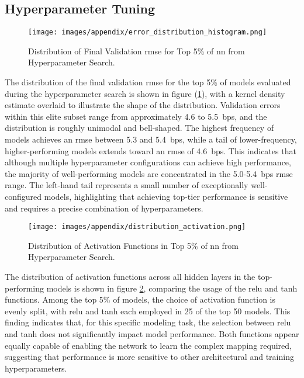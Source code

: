 \subsection{Hyperparameter Tuning}
\begin{figure}[H]
	\centering
	\texttt{[image: images/appendix/error\_distribution\_histogram.png]}
	\caption{Distribution of Final Validation \ac{rmse} for Top 5\% of \ac{nn} from Hyperparameter Search.}
	\label{fig:error_distribution_histogram}
\end{figure}
The distribution of the final validation \ac{rmse} for the top 5\% of models evaluated during the hyperparameter search is shown in figure (\ref{fig:error_distribution_histogram}), with a kernel density estimate overlaid to illustrate the shape of the distribution. Validation errors within this elite subset range from approximately 4.6 to 5.5~\ac{bps}, and the distribution is roughly unimodal and bell-shaped. The highest frequency of models achieves an \ac{rmse} between 5.3 and 5.4~\ac{bps}, while a tail of lower-frequency, higher-performing models extends toward an \ac{rmse} of 4.6~\ac{bps}. This indicates that although multiple hyperparameter configurations can achieve high performance, the majority of well-performing models are concentrated in the 5.0-5.4~\ac{bps} \ac{rmse} range. The left-hand tail represents a small number of exceptionally well-configured models, highlighting that achieving top-tier performance is sensitive and requires a precise combination of hyperparameters.

\begin{figure}[H]
	\centering
	\texttt{[image: images/appendix/distribution\_activation.png]}
	\caption{Distribution of Activation Functions in Top 5\% of \ac{nn} from Hyperparameter Search.}
	\label{fig:distribution_activation}
\end{figure}
The distribution of activation functions across all hidden layers in the top-performing models is shown in figure \ref{fig:distribution_activation}, comparing the usage of the \ac{relu} and \ac{tanh} functions. Among the top 5\% of models, the choice of activation function is evenly split, with \ac{relu} and \ac{tanh} each employed in 25 of the top 50 models. This finding indicates that, for this specific modeling task, the selection between \ac{relu} and \ac{tanh} does not significantly impact model performance. Both functions appear equally capable of enabling the network to learn the complex mapping required, suggesting that performance is more sensitive to other architectural and training hyperparameters.

